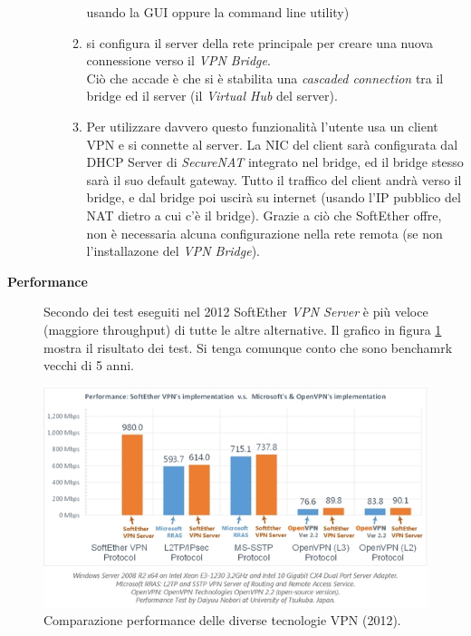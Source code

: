\begin{description}
\begin{itemize}
\begin{enumerate}
      usando la GUI oppure la command line utility)
      \item si configura il server della rete principale per creare una nuova connessione verso il \textit{VPN Bridge}.\\
      Ciò che accade è che si è stabilita una \textit{cascaded connection} tra il bridge ed il server (il \textit{Virtual Hub}
      del server).
      \item Per utilizzare davvero questo funzionalità l'utente usa un client VPN e si connette al server. La NIC
      del client sarà configurata dal DHCP Server di \textit{SecureNAT} integrato nel bridge,
      ed il bridge stesso sarà il suo default gateway. Tutto il traffico del client andrà verso il bridge, e dal bridge poi
      uscirà su internet (usando l'IP pubblico del NAT dietro a cui c'è il bridge). Grazie a ciò che SoftEther offre,
      non è necessaria alcuna configurazione nella rete remota (se non l'installazone del \textit{VPN Bridge}).
    \end{enumerate}
  \end{itemize}
  \item[\textbf{Performance}]Secondo dei test eseguiti nel 2012 SoftEther \textit{VPN Server} è più veloce (maggiore throughput) di tutte le
  altre alternative. Il grafico in figura \ref{fig:softether-performance} mostra il risultato dei test. Si tenga comunque
  conto che sono benchamrk vecchi di 5 anni.
\end{description}
\begin{figure}
  \includegraphics[scale=0.4]{img/softether_perf}
  \caption[Comparazione performance delle diverse tecnologie VPN]{Comparazione performance delle diverse tecnologie VPN (2012).}
  \label{fig:softether-performance}
\end{figure}

